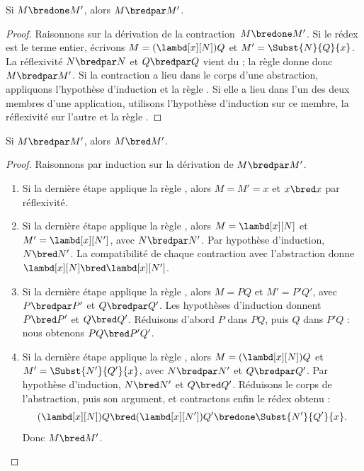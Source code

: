 \documentclass[../../../include/open-logic-section]{subfiles}
\begin{document}

\begin{lem}
Si $M \bredone M'$, alors $M \bredpar M'$.
\end{lem}

\begin{proof}
Raisonnons sur la dérivation de la
contraction~$M\bredone M'$. Si le rédex
est le terme entier, écrivons
$M=(\lambd[x][N])Q$ et
$M'=\Subst{N}{Q}{x}$. La réflexivité
$N\bredpar N$ et $Q\bredpar Q$ vient du
; la règle
 donne donc
$M\bredpar M'$. Si la contraction a lieu
dans le corps d'une abstraction, appliquons
l'hypothèse d'induction et la règle
. Si elle a lieu
dans l'un des deux membres d'une application,
utilisons l'hypothèse d'induction sur ce
membre, la réflexivité sur l'autre et la règle
.
\end{proof}

\begin{lem}
Si $M \bredpar M'$, alors $M \bred M'$.
\end{lem}

\begin{proof}
Raisonnons par induction sur la dérivation
de $M\bredpar M'$.
\begin{enumerate}
\item Si la dernière étape applique la règle
  , alors
  $M=M'=x$ et $x\bred x$ par réflexivité.
\item Si la dernière étape applique la règle
  , alors
  $M=\lambd[x][N]$ et
  $M'=\lambd[x][N']$, avec
  $N\bredpar N'$. Par hypothèse
  d'induction, $N\bred N'$. La
  compatibilité de chaque contraction
  avec l'abstraction donne
  $\lambd[x][N]\bred\lambd[x][N']$.
\item Si la dernière étape applique la règle
  , alors
  $M=PQ$ et $M'=P'Q'$, avec
  $P\bredpar P'$ et $Q\bredpar Q'$.
  Les hypothèses d'induction donnent
  $P\bred P'$ et $Q\bred Q'$.
  Réduisons d'abord $P$ dans $PQ$,
  puis $Q$ dans $P'Q$ : nous obtenons
  $PQ\bred P'Q'$.
\item Si la dernière étape applique la règle
  , alors
  $M=(\lambd[x][N])Q$ et
  $M'=\Subst{N'}{Q'}{x}$, avec
  $N\bredpar N'$ et $Q\bredpar Q'$.
  Par hypothèse d'induction,
  $N\bred N'$ et $Q\bred Q'$.
  Réduisons le corps de l'abstraction,
  puis son argument, et contractons
  enfin le rédex obtenu :
  \[
    (\lambd[x][N])Q
    \bred (\lambd[x][N'])Q'
    \bredone \Subst{N'}{Q'}{x}.
  \]
  Donc $M\bred M'$.
\end{enumerate}
\end{proof}
\end{document}
